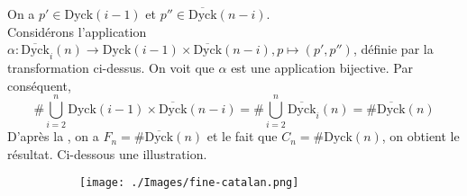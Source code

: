 On a $p'\in \text{Dyck}(i-1) $ et  $p'' \in \overline{\text{Dyck}}(n-i)$. \\
Considérons l'application $\alpha: \overline{\text{Dyck}}_{i}(n) \longrightarrow \text{Dyck}(i-1) \times \overline{\text{Dyck}}(n-i), p \mapsto (p', p'')$, définie par la transformation ci-dessus. On voit que $\alpha$ est une application bijective.\newpage
Par conséquent,
$$\#\underset{i=2}{\overset{n}{\bigcup}}\text{Dyck}(i-1) \times \overline{\text{Dyck}}(n-i)= \# \underset{i=2}{\overset{n}{\bigcup}}\overline{\text{Dyck}}_{i}(n) = \# \overline{\text{Dyck}}(n)$$
D'après la , on a $F_{n} = \#\overline{\text{Dyck}}(n)$ et le fait que $C_{n}=\#\text{Dyck}(n)$, on obtient le résultat.
Ci-dessous une illustration.
\begin{figure}[h!]
	\begin{subfigure}[b]{0.38\textwidth}
		\centering
		\texttt{[image: ./Images/fine-catalan.png]}
	\end{subfigure}
\end{figure}
























